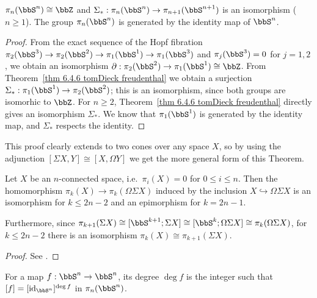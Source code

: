 \begin{thm}\label{thm 6.4.7 tomDieck freudenthal}
    $\pi_n(\bbS^n)\cong \bbZ$ and $\Sigma_\ast:\pi_n(\bbS^n)\to \pi_{n+1}(\bbS^{n+1})$ is an isomorphism ($n\geq 1$). The group $\pi_n(\bbS^n)$ is generated by the identity map of $\bbS^n$.
\end{thm}
\begin{proof}
    From the exact sequence of the Hopf fibration $\pi_2(\bbS^3)\to \pi_2(\bbS^2)\to \pi_1(\bbS^1)\to \pi_1(\bbS^3)$ and $\pi_j(\bbS^3)=0$ for $j=1,2$, we obtain an isomorphism $\partial:\pi_2(\bbS^2)\to \pi_1(\bbS^1)\cong \bbZ$. From Theorem~\ref{thm 6.4.6 tomDieck freudenthal} we obtain a surjection $\Sigma_\ast:\pi_1(\bbS^1)\to \pi_2(\bbS^2)$; this is an isomorphism, since both groups are isomorhic to $\bbZ$. For $n\geq 2$, Theorem~\ref{thm 6.4.6 tomDieck freudenthal} directly gives an isomorphism $\Sigma_\ast$. We know that $\pi_1(\bbS^1)$ is generated by the identity map, and $\Sigma_\ast$ respects the identity.
\end{proof}

This proof clearly extends to two cones over any space $X$, so by using the adjunction $[\Sigma X,Y]\cong[X,\Omega Y]$ we get the more general form of this Theorem.

\begin{thm}
Let $X$ be an $n$-connected space, i.e.\ $\pi_i(X)=0$ for $0\leq i\leq n$. Then the homomorphism $\pi_k(X)\to \pi_k(\Omega \Sigma X)$ induced by the inclusion $X\hookrightarrow \Omega\Sigma X$ is an isomorphism for $k\leq 2n-2$ and an epimorphism for $k=2n-1$.

Furthermore, since $\pi_{k+1}(\Sigma X)\cong[\bbS^{k+1};\Sigma X]\cong[\bbS^k;\Omega \Sigma X]\cong\pi_k(\Omega \Sigma X)$, for $k\leq 2n-2$ there is an isomorphism $\pi_k(X)\cong \pi_{k+1}(\Sigma X)$.
\end{thm}
\begin{proof}
See \cite[Theorem 6.4.6]{tomDieck}.
\end{proof}

\begin{defn}
    For a map $f:\bbS^n\to \bbS^n$, its degree $\deg f$ is the integer such that $[f]=[\mathrm{id}_{\bbS^n}]^{\deg f}$ in $\pi_n(\bbS^n)$.
\end{defn}

